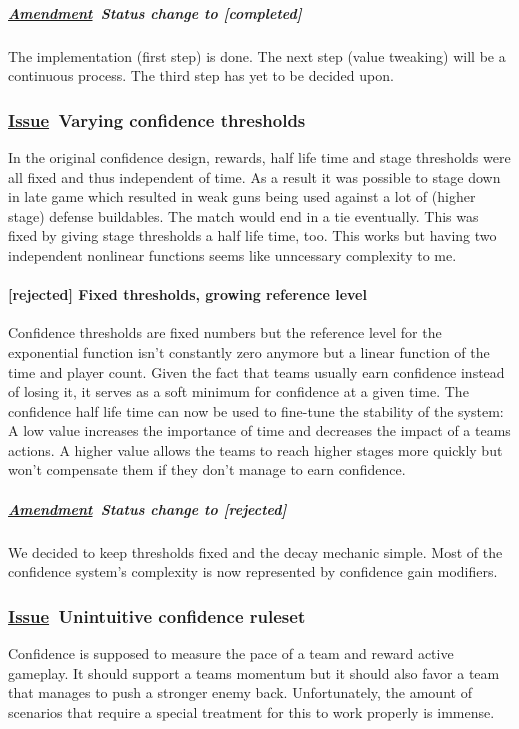 \documentclass{scrartcl}
\newcommand{\issue}    [0]{\textbf{\underline{Issue}\ }}
\newcommand{\rejected} [0]{\textcolor{rejected} {\textbf{[rejected] }}}
\newcommand{\completed}[0]{\textcolor{completed}{\textbf{[completed] }}}
\newcommand{\amendment}[0]{\textbf{\underline{Amendment}\ }}
\begin{document}
\subparagraph{\amendment Status change to \completed}

The implementation (first step) is done. The next step (value tweaking) will be a continuous process. The third step has yet to be decided upon.

\subsubsection{\issue Varying confidence thresholds}

In the original confidence design, rewards, half life time and stage thresholds were all fixed and thus independent of time. As a result it was possible to stage down in late game which resulted in weak guns being used against a lot of (higher stage) defense buildables. The match would end in a tie eventually. This was fixed by giving stage thresholds a half life time, too. This works but having two independent nonlinear functions seems like unncessary complexity to me.

\paragraph{\rejected Fixed thresholds, growing reference level}

Confidence thresholds are fixed numbers but the reference level for the exponential function isn't constantly zero anymore but a linear function of the time and player count. Given the fact that teams usually earn confidence instead of losing it, it serves as a soft minimum for confidence at a given time. The confidence half life time can now be used to fine-tune the stability of the system: A low value increases the importance of time and decreases the impact of a teams actions. A higher value allows the teams to reach higher stages more quickly but won't compensate them if they don't manage to earn confidence.

\subparagraph{\amendment Status change to \rejected}

We decided to keep thresholds fixed and the decay mechanic simple. Most of the confidence system's complexity is now represented by confidence gain modifiers.

\subsubsection{\issue Unintuitive confidence ruleset}

Confidence is supposed to measure the pace of a team and reward active gameplay. It should support a teams momentum but it should also favor a team that manages to push a stronger enemy back. Unfortunately, the amount of scenarios that require a special treatment for this to work properly is immense.
\end{document}
